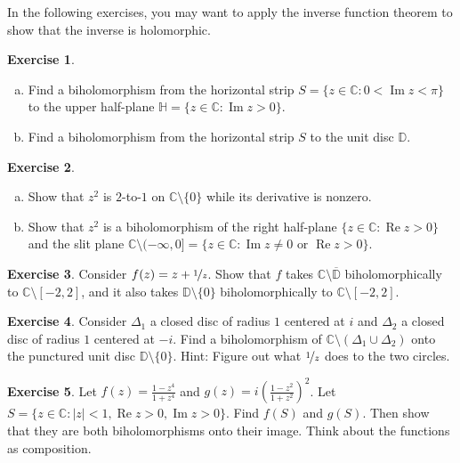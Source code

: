 \documentclass[12pt,openany]{book}
\newcommand{\widebar}[1]{\overline{#1}}
\renewcommand{\Re}{\operatorname{Re}}
\renewcommand{\Im}{\operatorname{Im}}
\newcommand{\sabs}[1]{\lvert {#1} \rvert}
\newcommand{\C}{{\mathbb{C}}}
\newcommand{\D}{{\mathbb{D}}}
\newcommand{\bH}{{\mathbb{H}}}
\theoremstyle{plain}
\theoremstyle{remark}
\theoremstyle{definition}
\newenvironment{exbox}{%
    \def\FrameCommand{\vrule width 1pt \relax\hspace{10pt}}%
    \MakeFramed{\advance\hsize-\width\FrameRestore}%
}{%
    \endMakeFramed
}
\newenvironment{exparts}{%
    \leavevmode\begin{enumerate}[a),noitemsep,topsep=0pt,parsep=0pt,partopsep=0pt]
}{%
    \end{enumerate}
}
\theoremstyle{exercise}
\newtheorem{exercise}{Exercise}[section]
\theoremstyle{example}
\begin{document}
In the following exercises, you may want to apply the inverse
function theorem to show that the inverse is holomorphic.

\begin{exbox}
\begin{exercise}
\begin{exparts}
\item
Find a biholomorphism from the horizontal strip
$S = \{ z \in \C : 0 < \Im z < \pi \}$ to
the upper half-plane $\bH = \{ z \in \C : \Im z > 0 \}$.
\item
Find a biholomorphism from the horizontal strip
$S$ to the unit disc $\D$.
\end{exparts}
\end{exercise}

\begin{exercise}
\pagebreak[2]
\begin{exparts}
\item
Show that $z^2$ is $2$-to-$1$ on $\C \setminus \{ 0 \}$ while its
derivative is nonzero.
\item
Show that $z^2$ is a biholomorphism of the right half-plane
$\{ z \in \C : \Re z > 0 \}$
and the slit plane $\C \setminus (-\infty,0] = \{ z \in \C : \Im z \neq 0 \text{ or } \Re z > 0 \}$.
\end{exparts}
\end{exercise}

\begin{exercise} \label{exercise:segmentcomplement}
Consider $f(z) = z+ \nicefrac{1}{z}$.  Show that $f$ takes $\C \setminus
\widebar{\D}$ biholomorphically to $\C \setminus [-2,2]$, and it also takes
$\D \setminus \{ 0 \}$ biholomorphically to $\C \setminus [-2,2]$.
\end{exercise}

\begin{exercise}
Consider $\Delta_1$ a closed disc of radius $1$ centered at $i$ and
$\Delta_2$ a closed disc of radius $1$ centered at $-i$.
Find a biholomorphism of $\C \setminus (\Delta_1 \cup \Delta_2)$
onto the punctured unit disc $\D \setminus \{ 0 \}$.
Hint: Figure out what $\nicefrac{1}{z}$ does to the two circles.
\end{exercise}

\begin{exercise}
Let $f(z) = \frac{1-z^4}{1+z^4}$ and $g(z) = i {\left( \frac{1-z^2}{1+z^2}
\right)}^2$.  Let $S = \{ z \in \C : \sabs{z} < 1, \Re z > 0, \Im z > 0 \}$.
Find $f(S)$ and $g(S)$.  Then show that they are both biholomorphisms onto their
image.  Think about the functions as composition.
\end{exercise}


\end{exbox}
\end{document}
